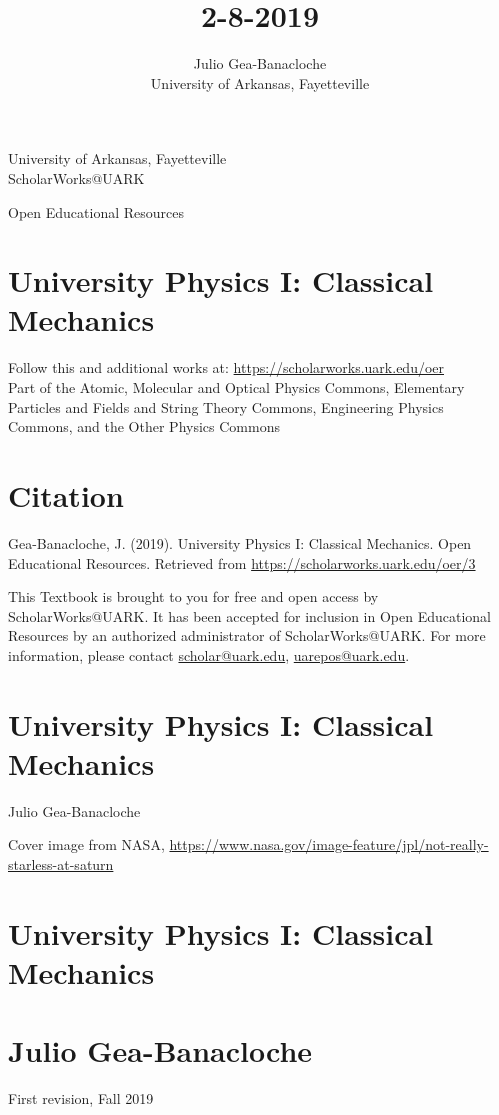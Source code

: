 \documentclass[10pt]{article}
\title{2-8-2019 }
\author{Julio Gea-Banacloche\\
University of Arkansas, Fayetteville}
\date{}
\begin{document}
\maketitle
University of Arkansas, Fayetteville\\
ScholarWorks@UARK

Open Educational Resources

\section*{University Physics I: Classical Mechanics}
Follow this and additional works at: \href{https://scholarworks.uark.edu/oer}{https://scholarworks.uark.edu/oer}\\
Part of the Atomic, Molecular and Optical Physics Commons, Elementary Particles and Fields and String Theory Commons, Engineering Physics Commons, and the Other Physics Commons

\section*{Citation}
Gea-Banacloche, J. (2019). University Physics I: Classical Mechanics. Open Educational Resources. Retrieved from \href{https://scholarworks.uark.edu/oer/3}{https://scholarworks.uark.edu/oer/3}

This Textbook is brought to you for free and open access by ScholarWorks@UARK. It has been accepted for inclusion in Open Educational Resources by an authorized administrator of ScholarWorks@UARK. For more information, please contact \href{mailto:scholar@uark.edu}{scholar@uark.edu}, \href{mailto:uarepos@uark.edu}{uarepos@uark.edu}.

\section*{University Physics I: Classical Mechanics}
Julio Gea-Banacloche

Cover image from NASA, \href{https://www.nasa.gov/image-feature/jpl/not-really-starless-at-saturn}{https://www.nasa.gov/image-feature/jpl/not-really-starless-at-saturn}

\section*{University Physics I: Classical Mechanics}
\section*{Julio Gea-Banacloche}
First revision, Fall 2019
\end{document}
